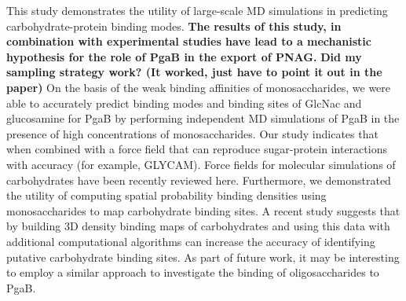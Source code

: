 
This study demonstrates the utility of large-scale MD simulations in predicting carbohydrate-protein binding modes. \textbf{The results of this study, in combination with experimental studies have lead to a mechanistic hypothesis for the role of PgaB in the export of PNAG.} \textbf{Did my sampling strategy work? (It worked, just have to point it out in the paper)} On the basis of the weak binding affinities of monosaccharides, we were able to accurately predict binding modes and binding sites of GlcNac and glucosamine for PgaB by performing independent MD simulations of PgaB in the presence of high concentrations of monosaccharides. Our study indicates that when combined with a force field that can reproduce sugar-protein interactions with accuracy (for example, GLYCAM\cite{Kirschner:2008ii}). Force fields for molecular simulations of carbohydrates have been recently reviewed here.\cite{Fadda:2010p5889} Furthermore, we demonstrated the utility of computing spatial probability binding densities using monosaccharides to map carbohydrate binding sites. A recent study suggests that by building 3D density binding maps of carbohydrates and using this data with additional computational algorithms can increase the accuracy of identifying putative carbohydrate binding sites.\cite{Tsai:2012bj} As part of future work, it may be interesting to employ a similar approach to investigate the binding of oligosaccharides to PgaB.

